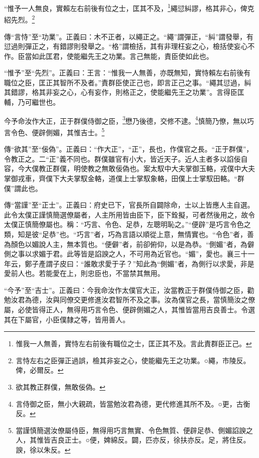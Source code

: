 “惟予一人無良，實賴左右前後有位之士，匡其不及，\footnote{惟我一人無善，實恃左右前後有職位之士，匡正其不及。言此責群臣正己。}繩愆糾謬，格其非心，俾克紹先烈。\footnote{言恃左右之臣彈正過誤，檢其非妄之心，使能繼先王之功業。○繩，市陵反。俾，必爾反。}


{\noindent\zhuan{}\fzbyks 傳“言恃”至“功業”。正義曰：木不正者，以繩正之。“繩”謂彈正，“糾”謂發舉，有愆過則彈正之，有錯謬則發舉之。“格”謂檢括，其有非理枉妄之心，檢括使妄心不作。臣當如此匡君，使能繼先王之功業。言己無能，責臣使如此也。 \par}

{\noindent\shu{}\fzkt “惟予”至“先烈”。正義曰：王言：“惟我一人無善，亦既無知，實恃賴左右前後有職位之臣，匡正其智所不及者。”責群臣使正己也，即言正己之事。“繩其愆過，糾其錯謬，格其非妄之心，心有妄作，則格正之，使能繼先王之功業”。言得臣匡輔，乃可繼世也。 \par}

今予命汝作大正，正于群僕侍御之臣，\footnote{欲其教正群僕，無敢佞偽。}懋乃後德，交修不逮。\footnote{言侍御之臣，無小大親疏，皆當勉汝君為德，更代修進其所不及。○更，古衡反。}慎簡乃僚，無以巧言令色、便辟側媚，其惟吉士。\footnote{當謹慎簡選汝僚屬侍臣，無得用巧言無實、令色無質、便辟足恭、側媚諂諛之人，其惟皆吉良正士。○便，婢綿反。闢，匹亦反，徐扶亦反。足，將住反。諛，徐以朱反。}


{\noindent\zhuan{}\fzbyks 傳“欲其”至“佞偽”。正義曰：“作大正”，“正”，長也，作僕官之長。“正于群僕”，令教正之。二“正”義不同也。群僕雖官有小大，皆近天子。近人主者多以諂佞自容，今大僕教正群僕，明使教之無敢佞偽也。案太馭中大夫掌御玉輅，戎僕中大夫掌御戎車，齊僕下大夫掌馭金輅，道僕上士掌馭象輅，田僕上士掌馭田輅。“群僕”謂此也。 \par}

{\noindent\zhuan{}\fzbyks 傳“當謹”至“正士”。正義曰：府史已下，官長所自闢除命，士以上皆應人主自選。此令太僕正謹慎簡選僚屬者，人主所用皆由臣下，臣下銓擬，可者然後用之，故令太僕正慎簡僚屬也。稱：“巧言、令色、足恭，左聰明恥之。”“便辟”是巧言令色之類，知是彼“足恭”也。“巧言”者，巧為言語以順從上意，無情實也。“令色”者，善為顏色以媚說人主，無本質也。“便僻”者，前卻俯仰，以是為恭。“側媚”者，為僻側之事以求媚于君。此等皆是諂諛之人，不可用為近官也。“媚”，愛也。襄三十一年云，鄭子產謂子皮曰：“誰敢求愛于子？”知此為“側媚”者，為側行以求愛，非是愛前人也。若能愛在上，則忠臣也，不當禁其無用。 \par}

{\noindent\shu{}\fzkt “今予”至“吉士”。正義曰：今我命汝作太僕官大正，汝當教正于群僕侍御之臣，勸勉汝君為德，汝與同僚交更修進汝君智所不及之事。汝為僕官之長，當慎簡汝之僚屬，必使皆得正人，無得用巧言令色、便辟側媚之人，其惟皆當用吉良善士。令選其在下屬官，小臣僕隸之等，皆用善人。 \par}


